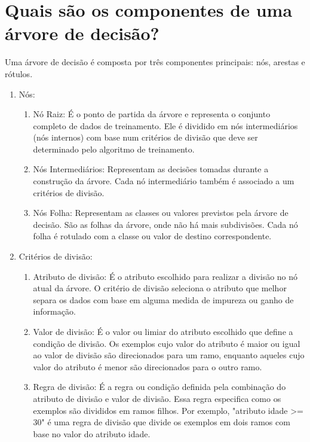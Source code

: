 \documentclass[12pt,a4paper, brazil]{article}
\begin{document}
\section{Quais são os componentes de uma árvore de decisão?}

Uma árvore de decisão é composta por três componentes principais: nós, arestas e rótulos.

\begin{enumerate}
    \item Nós:
    \begin{enumerate}
        \item Nó Raiz: É o ponto de partida da árvore e representa o conjunto completo de dados de treinamento. Ele é dividido em nós intermediários (nós internos) com base num critérios de divisão que deve ser determinado pelo algoritmo de treinamento.
        \item Nós Intermediários: Representam as decisões tomadas durante a construção da árvore. Cada nó intermediário também é associado a um critérios de divisão.
        \item Nós Folha: Representam as classes ou valores previstos pela árvore de decisão. São as folhas da árvore, onde não há mais subdivisões. Cada nó folha é rotulado com a classe ou valor de destino correspondente.
    \end{enumerate}
       
    \item Critérios de divisão:
        \begin{enumerate}
            \item Atributo de divisão: É o atributo escolhido para realizar a divisão no nó atual da árvore. O critério de divisão seleciona o atributo que melhor separa os dados com base em alguma medida de impureza ou ganho de informação.

            \item Valor de divisão: É o valor ou limiar do atributo escolhido que define a condição de divisão. Os exemplos cujo valor do atributo é maior ou igual ao valor de divisão são direcionados para um ramo, enquanto aqueles cujo valor do atributo é menor são direcionados para o outro ramo.
            
            \item Regra de divisão: É a regra ou condição definida pela combinação do atributo de divisão e valor de divisão. Essa regra especifica como os exemplos são divididos em ramos filhos. Por exemplo, "atributo idade >= 30" é uma regra de divisão que divide os exemplos em dois ramos com base no valor do atributo idade.    
        \end{enumerate}
    

\end{enumerate}
\end{document}
